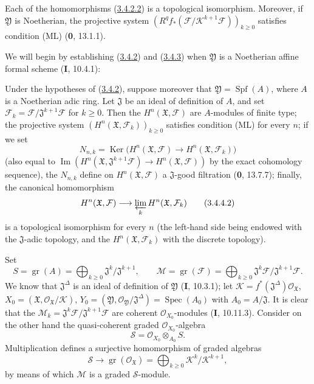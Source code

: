 \begin{corollary}[3.4.3]
\label{III.3.4.3}
Each of the homomorphisms \textup{(\hyperref[III.3.4.2.2]{3.4.2.2})} is a
topological isomorphism. Moreover, if $\mathfrak Y$ is Noetherian, the
projective system
$(R^qf_*(\mathcal F/\mathcal K^{k+1}\mathcal F))_{k\geq0}$ satisfies
condition \textup{(ML)} \textup{(\textbf{0}, 13.1.1)}.
\end{corollary}

We will begin by establishing (\hyperref[III.3.4.2]{3.4.2}) and
(\hyperref[III.3.4.3]{3.4.3}) when $\mathfrak Y$ is a Noetherian affine
formal scheme (\textbf{I}, 10.4.1):

\begin{corollary}[3.4.4]
\label{III.3.4.4}
Under the hypotheses of \textup{(\hyperref[III.3.4.2]{3.4.2})}, suppose moreover
that $\mathfrak Y=\operatorname{Spf}(A)$, where $A$ is a Noetherian adic
ring. Let $\mathfrak J$ be an ideal of definition of $A$, and set
$\mathcal F_k=\mathcal F/\mathfrak J^{k+1}\mathcal F$ for $k\geq0$. Then
the $H^n(\mathfrak X,\mathcal F)$ are $A$-modules of finite type; the
projective system $(H^n(\mathfrak X,\mathcal F_k))_{k\geq0}$ satisfies
condition \textup{(ML)} for every $n$; if we set
\[
N_{n,k}=\operatorname{Ker}\bigl(H^n(\mathfrak X,\mathcal F)
\longrightarrow H^n(\mathfrak X,\mathcal F_k)\bigr)
\tag{3.4.4.1}\label{III.3.4.4.1}
\]
(also equal to
$\operatorname{Im}(H^n(\mathfrak X,\mathfrak J^{k+1}\mathcal F)
\to H^n(\mathfrak X,\mathcal F))$ by the exact cohomology sequence), the
$N_{n,k}$ define on $H^n(\mathfrak X,\mathcal F)$ a
$\mathfrak J$-good filtration \textup{(\textbf{0}, 13.7.7)}; finally, the canonical homomorphism
\[
H^n(\mathfrak X,\mathcal F)
\longrightarrow\varprojlim_kH^n(\mathfrak X,\mathcal F_k)
\tag{3.4.4.2}\label{III.3.4.4.2}
\]
is a topological isomorphism for every $n$ (the left-hand side being endowed
with the $\mathfrak J$-adic topology, and the $H^n(\mathfrak X,\mathcal F_k)$ with
the discrete topology).
\end{corollary}

Set
\[
S=\operatorname{gr}(A)=\bigoplus_{k\geq0}
\mathfrak J^k/\mathfrak J^{k+1},\qquad
\mathcal M=\operatorname{gr}(\mathcal F)=\bigoplus_{k\geq0}
\mathfrak J^k\mathcal F/\mathfrak J^{k+1}\mathcal F.
\tag{3.4.4.3}\label{III.3.4.4.3}
\]
We know that $\mathfrak J^\Delta$ is an ideal of definition of $\mathfrak Y$
(\textbf{I}, 10.3.1); let
$\mathcal K=f^*(\mathfrak J^\Delta)\mathcal O_{\mathfrak X}$,
$X_0=(\mathfrak X,\mathcal O_{\mathfrak X}/\mathcal K)$,
$Y_0=(\mathfrak Y,\mathcal O_{\mathfrak Y}/\mathfrak J^\Delta)
=\operatorname{Spec}(A_0)$ with $A_0=A/\mathfrak J$. It is clear that the
$\mathcal M_k=\mathfrak J^k\mathcal F/\mathfrak J^{k+1}\mathcal F$ are
coherent $\mathcal O_{X_0}$-modules (\textbf{I}, 10.11.3). Consider on the other hand the
quasi-coherent graded $\mathcal O_{X_0}$-algebra
\[
\mathcal S=\mathcal O_{X_0}\otimes_{A_0}S.
\tag{3.4.4.4}\label{III.3.4.4.4}
\]
Multiplication defines a surjective homomorphism of graded algebras
\[
\mathcal S\longrightarrow
\operatorname{gr}(\mathcal O_{\mathfrak X})
=\bigoplus_{k\geq0}\mathcal K^k/\mathcal K^{k+1},
\]
by means of which $\mathcal M$ is a graded $\mathcal S$-module.

